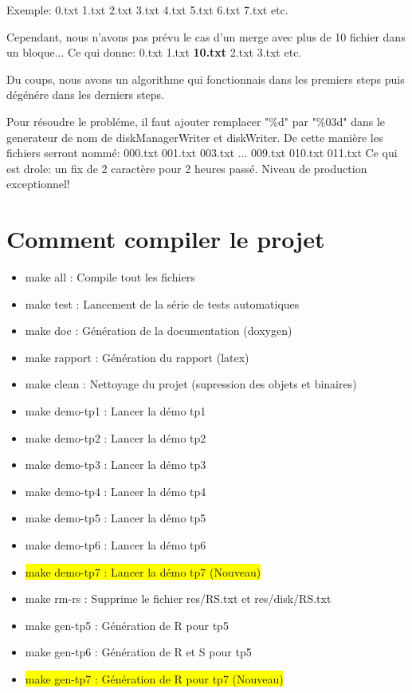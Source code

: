 \documentclass[a4paper]{article}
\begin{document}
Exemple: 0.txt 1.txt  2.txt  3.txt  4.txt  5.txt  6.txt  7.txt etc.

Cependant, nous n'avons pas prévu le cas d'un merge avec plus de 10 fichier dans
un bloque...
Ce qui donne: 0.txt 1.txt \textbf{10.txt} 2.txt  3.txt etc.

Du coups, nous avons un algorithme qui fonctionnais dans les premiers steps puis
dégénére dans les derniers steps.

Pour résoudre le probléme, il faut ajouter remplacer "\%d" par "\%03d" dans le generateur
de nom de diskManagerWriter et diskWriter. De cette manière les fichiers
serront nommé: 000.txt 001.txt 003.txt ... 009.txt 010.txt 011.txt
Ce qui est drole: un fix de 2 caractère pour 2 heures passé.
Niveau de production exceptionnel!

\section{Comment compiler le projet}

\begin{itemize}
	\item make all : Compile tout les fichiers
	\item make test : Lancement de la série de tests automatiques
	\item make doc  : Génération de la documentation (doxygen)
	\item make rapport : Génération du rapport (latex)
	\item make clean : Nettoyage du projet (supression des objets et binaires)
	\item make demo-tp1 : Lancer la démo tp1
	\item make demo-tp2 : Lancer la démo tp2
	\item make demo-tp3 : Lancer la démo tp3
	\item make demo-tp4 : Lancer la démo tp4
	\item make demo-tp5 : Lancer la démo tp5
  \item make demo-tp6 : Lancer la démo tp6
  \item \colorbox{yellow}{make demo-tp7 : Lancer la démo tp7 (Nouveau)}
	\item make rm-rs : Supprime le fichier res/RS.txt et res/disk/RS.txt
  \item make gen-tp5 : Génération de R pour tp5
  \item make gen-tp6 : Génération de R et S pour tp5
  \item \colorbox{yellow}{make gen-tp7 : Génération de R pour tp7 (Nouveau)}
\end{itemize}
\end{document}
